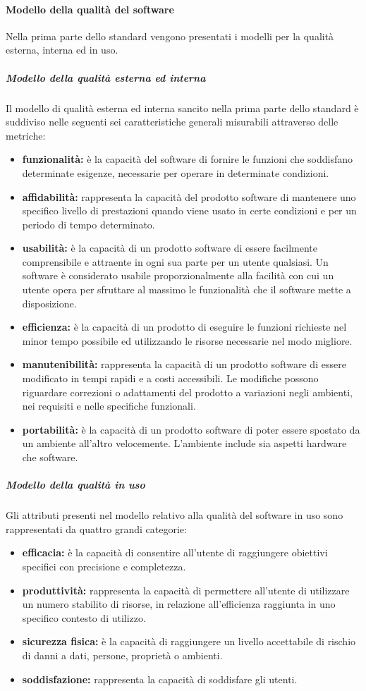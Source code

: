 			\paragraph{Modello della qualità del software}
			Nella prima parte dello standard vengono presentati i modelli per la qualità esterna, interna ed in uso.
				\subparagraph{Modello della qualità esterna ed interna}
				Il modello di qualità esterna ed interna sancito nella prima parte dello standard è suddiviso nelle seguenti sei caratteristiche generali misurabili attraverso delle metriche:
				\begin{itemize}
					\item \textbf{funzionalità:} è la capacità del software di fornire le funzioni che soddisfano determinate esigenze, necessarie per operare in determinate condizioni. 
					\item \textbf{affidabilità:} rappresenta la capacità del prodotto software di mantenere uno specifico livello di prestazioni quando viene usato in certe condizioni e per un periodo di tempo determinato.
					\item \textbf{usabilità:} è la capacità di un prodotto software di essere facilmente comprensibile e attraente in ogni sua parte per un utente qualsiasi. Un software è considerato usabile proporzionalmente alla facilità con cui un utente opera per sfruttare al massimo le funzionalità che il software mette a disposizione.
					\item \textbf{efficienza:} è la capacità di un prodotto di eseguire le funzioni richieste nel minor tempo possibile ed utilizzando le risorse necessarie nel modo migliore.
					\item \textbf{manutenibilità:} rappresenta la capacità di un prodotto software di essere modificato in tempi rapidi e a costi accessibili. Le modifiche possono riguardare correzioni o adattamenti del prodotto a variazioni negli ambienti, nei requisiti e nelle specifiche funzionali.
					\item \textbf{portabilità:} è la capacità di un prodotto software di poter essere spostato da un ambiente all'altro velocemente. L'ambiente include sia aspetti hardware che software.
				\end{itemize}
				
				\subparagraph{Modello della qualità in uso}
				Gli attributi presenti nel modello relativo alla qualità del software in uso sono rappresentati da quattro grandi categorie:
				\begin{itemize}
					\item \textbf{efficacia:} è la capacità di consentire all'utente di raggiungere obiettivi specifici con precisione e completezza.
					\item \textbf{produttività:} rappresenta la capacità di permettere all'utente di utilizzare un numero stabilito di risorse, in relazione all'efficienza raggiunta in uno specifico contesto di utilizzo.
					\item \textbf{sicurezza fisica:} è la capacità di raggiungere un livello accettabile di rischio di danni a dati, persone, proprietà o ambienti.
					\item \textbf{soddisfazione:} rappresenta la capacità di soddisfare gli utenti.
				\end{itemize}
